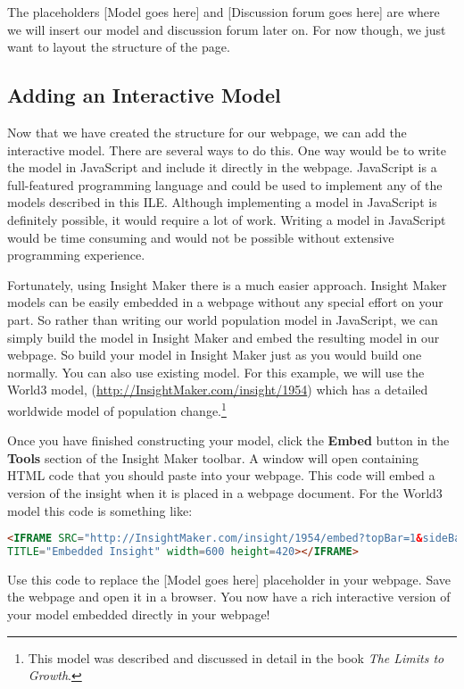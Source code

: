 \documentclass[]{memoir}
\renewcommand{\u}[1]{\textbf{#1}}
\begin{document}
The placeholders {[}Model goes here{]} and {[}Discussion forum goes
here{]} are where we will insert our model and discussion forum later
on. For now though, we just want to layout the structure of the page.

\subsection{Adding an Interactive Model}

Now that we have created the structure for our webpage, we can add the
interactive model. There are several ways to do this. One way would be
to write the model in JavaScript and include it directly in the webpage.
JavaScript is a full-featured programming language and could be used to
implement any of the models described in this ILE. Although implementing
a model in JavaScript is definitely possible, it would require a lot of
work. Writing a model in JavaScript would be time consuming and would
not be possible without extensive programming experience.

Fortunately, using Insight Maker there is a much easier approach.
Insight Maker models can be easily embedded in a webpage without any
special effort on your part. So rather than writing our world population
model in JavaScript, we can simply build the model in Insight Maker and
embed the resulting model in our webpage. So build your model in Insight
Maker just as you would build one normally. You can also use existing
model. For this example, we will use the World3 model,
(\url{http://InsightMaker.com/insight/1954}) which has a detailed
worldwide model of population change.\footnote{This model was described
  and discussed in detail in the book \emph{The Limits to Growth}.}

Once you have finished constructing your model, click the \u{Embed}
button in the \u{Tools} section of the Insight Maker toolbar. A window
will open containing HTML code that you should paste into your webpage.
This code will embed a version of the insight when it is placed in a
webpage document. For the World3 model this code is something like:

\begin{lstlisting}[language=HTML]
<IFRAME SRC="http://InsightMaker.com/insight/1954/embed?topBar=1&sideBar=1&zoom=1"
TITLE="Embedded Insight" width=600 height=420></IFRAME>
\end{lstlisting}

Use this code to replace the {[}Model goes here{]} placeholder in your
webpage. Save the webpage and open it in a browser. You now have a rich
interactive version of your model embedded directly in your webpage!
\end{document}
